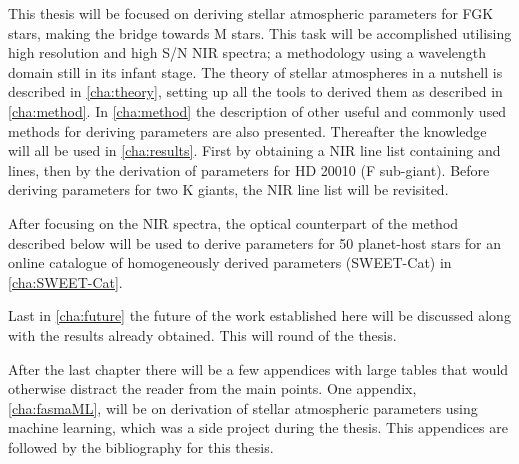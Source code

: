 This thesis will be focused on deriving stellar atmospheric parameters for FGK stars, making the
bridge towards M stars. This task will be accomplished utilising high resolution and high S/N NIR
spectra; a methodology using a wavelength domain still in its infant stage. The theory of stellar
atmospheres in a nutshell is described in \cref{cha:theory}, setting up all the tools to derived
them as described in \cref{cha:method}. In \cref{cha:method} the description of other useful and
commonly used methods for deriving parameters are also presented. Thereafter the knowledge will all
be used in \cref{cha:results}. First by obtaining a NIR line list containing  and
 lines, then by the derivation of parameters for HD 20010 (F sub-giant). Before deriving
parameters for two K giants, the NIR line list will be revisited.

After focusing on the NIR spectra, the optical counterpart of the method described below will be
used to derive parameters for 50 planet-host stars for an online catalogue of homogeneously derived
parameters (SWEET-Cat) in \cref{cha:SWEET-Cat}.

Last in \cref{cha:future} the future of the work established here will be discussed along with the
results already obtained. This will round of the thesis.

After the last chapter there will be a few appendices with large tables that would otherwise
distract the reader from the main points. One appendix, \cref{cha:fasmaML}, will be on derivation of
stellar atmospheric parameters using machine learning, which was a side project during the thesis.
This appendices are followed by the bibliography for this thesis.
